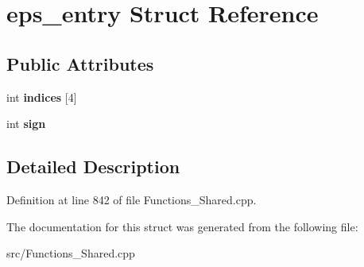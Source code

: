 \hypertarget{structeps__entry}{}\section{eps\+\_\+entry Struct Reference}
\label{structeps__entry}
\subsection*{Public Attributes}
\begin{DoxyCompactItemize}
\item 
\hypertarget{structeps__entry_aeb23818a8c93790dc84e159e22fece7c}{}int {\bfseries indices} \mbox{[}4\mbox{]}\label{structeps__entry_aeb23818a8c93790dc84e159e22fece7c}

\item 
\hypertarget{structeps__entry_a6557cf0ea08b5afe0e6f525e13934712}{}int {\bfseries sign}\label{structeps__entry_a6557cf0ea08b5afe0e6f525e13934712}

\end{DoxyCompactItemize}


\subsection{Detailed Description}


Definition at line 842 of file Functions\+\_\+\+Shared.\+cpp.



The documentation for this struct was generated from the following file\+:\begin{DoxyCompactItemize}
\item 
src/Functions\+\_\+\+Shared.\+cpp\end{DoxyCompactItemize}
